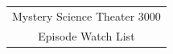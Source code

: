 \documentclass[12pt]{article}
\begin{document}
\begin{center}  %
 \hspace*{0.5in} \begin{tabular}{@{}c@{}}{\Large Mystery Science Theater 3000}\\{\Large Episode Watch List}\end{tabular} \hspace*{0.5in} 
\end{center}
\end{document}
